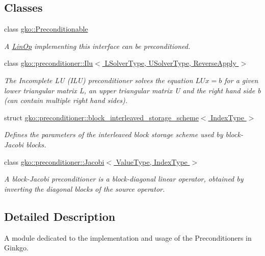 \subsection*{Classes}
\begin{DoxyCompactItemize}
\item 
class \hyperlink{classgko_1_1Preconditionable}{gko\+::\+Preconditionable}
\begin{DoxyCompactList}\small\item\em A \hyperlink{classgko_1_1LinOp}{Lin\+Op} implementing this interface can be preconditioned. \end{DoxyCompactList}\item 
class \hyperlink{classgko_1_1preconditioner_1_1Ilu}{gko\+::preconditioner\+::\+Ilu$<$ L\+Solver\+Type, U\+Solver\+Type, Reverse\+Apply $>$}
\begin{DoxyCompactList}\small\item\em The Incomplete LU (I\+LU) preconditioner solves the equation $LUx = b$ for a given lower triangular matrix L, an upper triangular matrix U and the right hand side b (can contain multiple right hand sides). \end{DoxyCompactList}\item 
struct \hyperlink{structgko_1_1preconditioner_1_1block__interleaved__storage__scheme}{gko\+::preconditioner\+::block\+\_\+interleaved\+\_\+storage\+\_\+scheme$<$ Index\+Type $>$}
\begin{DoxyCompactList}\small\item\em Defines the parameters of the interleaved block storage scheme used by block-\/\+Jacobi blocks. \end{DoxyCompactList}\item 
class \hyperlink{classgko_1_1preconditioner_1_1Jacobi}{gko\+::preconditioner\+::\+Jacobi$<$ Value\+Type, Index\+Type $>$}
\begin{DoxyCompactList}\small\item\em A block-\/\+Jacobi preconditioner is a block-\/diagonal linear operator, obtained by inverting the diagonal blocks of the source operator. \end{DoxyCompactList}\end{DoxyCompactItemize}


\subsection{Detailed Description}
A module dedicated to the implementation and usage of the Preconditioners in Ginkgo. 

